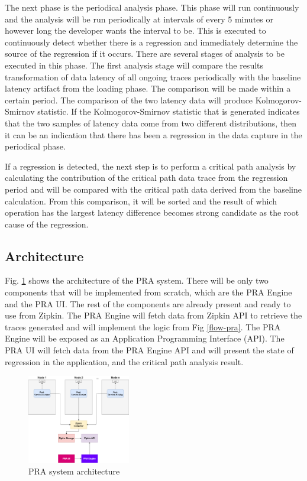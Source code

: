 \documentclass[conference]{configs/IEEEtran}
\begin{document}
The next phase is the periodical analysis phase. This phase will run continuously and the analysis will be run periodically at intervals of every 5 minutes or however long the developer wants the interval to be. This is executed to continuously detect whether there is a regression and
immediately determine the source of the regression if it occurs. There are several stages of analysis to be executed in this phase. The first analysis stage will compare the results transformation of data latency of all ongoing traces periodically with the baseline latency artifact from the loading phase. The comparison will be made within a certain period. The comparison of the two latency data will produce Kolmogorov-Smirnov statistic. If the Kolmogorov-Smirnov statistic that is generated indicates that the two samples of latency data come from two different distributions, then it can be an indication that there has been a regression in the data capture in the periodical phase.

If a regression is detected, the next step is to perform a critical path analysis by calculating the contribution of the critical path data trace from the regression period and will be compared with the critical path data derived from the baseline calculation. From this comparison, it will be sorted and the result of which operation has the largest latency difference becomes strong candidate as the root cause of the regression.

\subsection{Architecture}
Fig. \ref{arch-pra} shows the architecture of the PRA system. There will be only two components that will be implemented from scratch, which are the PRA Engine and the PRA UI. The rest of the components are already present and ready to use from Zipkin. The PRA Engine will fetch data from Zipkin API to retrieve the traces generated and will implement the logic from Fig \ref{flow-pra}. The PRA Engine will be exposed as an Application Programming Interface (API). The PRA UI will fetch data from the PRA Engine API and will present the state of regression in the application, and the critical path analysis result.
\begin{figure}[!htb]
	\centering
	\includegraphics[width=0.4\textwidth]{resources/ch3/arch.png}
	\caption{PRA system architecture}
	\label{arch-pra}
\end{figure}
\end{document}
